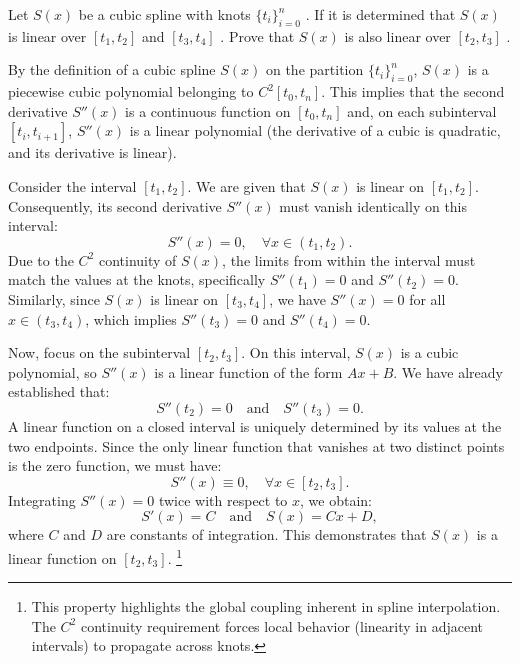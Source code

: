 \begin{exercise}
\label{applied:2021:2}
Let $S ( x )$ be a cubic spline with knots $\{ t _ { i } \} _ { i = 0 } ^ { n }$ . If it is determined that $S ( x )$ is linear over $[ t _ { 1 } , t _ { 2 } ]$ and $[ t _ { 3 } , t _ { 4 } ]$ . Prove that $S ( x )$ is also linear over $\left[ t _ { 2 } , t _ { 3 } \right]$ .
\end{exercise}

\begin{solution}
By the definition of a cubic spline $S(x)$ on the partition $\{t_i\}_{i=0}^n$, $S(x)$ is a piecewise cubic polynomial belonging to $C^2[t_0, t_n]$. This implies that the second derivative $S''(x)$ is a continuous function on $[t_0, t_n]$ and, on each subinterval $[t_i, t_{i+1}]$, $S''(x)$ is a linear polynomial (the derivative of a cubic is quadratic, and its derivative is linear).

Consider the interval $[t_1, t_2]$. We are given that $S(x)$ is linear on $[t_1, t_2]$. Consequently, its second derivative $S''(x)$ must vanish identically on this interval:
\[
S''(x) = 0, \quad \forall x \in (t_1, t_2).
\]
Due to the $C^2$ continuity of $S(x)$, the limits from within the interval must match the values at the knots, specifically $S''(t_1) = 0$ and $S''(t_2) = 0$. Similarly, since $S(x)$ is linear on $[t_3, t_4]$, we have $S''(x) = 0$ for all $x \in (t_3, t_4)$, which implies $S''(t_3) = 0$ and $S''(t_4) = 0$.

Now, focus on the subinterval $[t_2, t_3]$. On this interval, $S(x)$ is a cubic polynomial, so $S''(x)$ is a linear function of the form $Ax + B$. We have already established that:
\[
S''(t_2) = 0 \quad \text{and} \quad S''(t_3) = 0.
\]
A linear function on a closed interval is uniquely determined by its values at the two endpoints. Since the only linear function that vanishes at two distinct points is the zero function, we must have:
\[
S''(x) \equiv 0, \quad \forall x \in [t_2, t_3].
\]
Integrating $S''(x) = 0$ twice with respect to $x$, we obtain:
\[
S'(x) = C \quad \text{and} \quad S(x) = Cx + D,
\]
where $C$ and $D$ are constants of integration. This demonstrates that $S(x)$ is a linear function on $[t_2, t_3]$. \footnote{This property highlights the global coupling inherent in spline interpolation. The $C^2$ continuity requirement forces local behavior (linearity in adjacent intervals) to propagate across knots.}
\end{solution}

